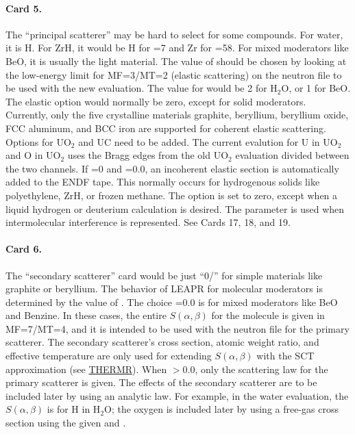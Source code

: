 \paragraph{Card 5.}
The ``principal scatterer'' may be hard to select for some compounds.
For water, it is H. For ZrH, it would be H for =7 and
Zr for =58.  For mixed moderators like BeO, it is usually
the light material.  The value of  should be chosen by
looking at the low-energy limit for MF=3/MT=2 (elastic scattering) on
the neutron file to be used with the new evaluation.  The value for
 would be 2 for H$_2$O, or 1 for BeO.  The elastic option
 would normally be zero, except for solid moderators.
Currently, only the five crystalline materials graphite, beryllium,
beryllium oxide, FCC aluminum, and BCC iron are supported for coherent
elastic scattering.  Options for UO$_2$ and UC need to be added.
The current evalution for U in UO$_2$ and O in UO$_2$ uses the Bragg
edges from the old UO$_2$ evaluation divided between the two channels.
If =0 and =0.0, an incoherent elastic section is
automatically added to the ENDF tape.  This normally occurs for
hydrogenous solids like polyethylene, ZrH, or frozen methane.  The
 option is set to zero, except when a liquid
hydrogen or deuterium calculation is desired.
The  parameter is used when intermolecular
interference is represented.
See Cards 17, 18, and 19.

\paragraph{Card 6.}
The ``secondary scatterer'' card would be just ``0/'' for simple
materials like graphite or beryllium.  The behavior of LEAPR for
molecular moderators is determined by the value of .
The choice =0.0 is for mixed moderators like BeO and
Benzine.  In these cases, the entire $S(\alpha,\beta)$ for the
molecule is given in MF=7/MT=4, and it is intended to be used with
the neutron file for the primary scatterer.  The secondary scatterer's
cross section, atomic weight ratio, and effective temperature are only
used for extending $S(\alpha,\beta)$ with the SCT approximation
(see \hyperlink{sTHERMRhy}{THERMR}).  When $>$0.0,
only the scattering law for the
primary scatterer is given.  The effects of the secondary scatterer are
to be included later by using an analytic law.  For example, in the
water evaluation, the $S(\alpha,\beta)$ is for H in H$_2$O; the oxygen
is included later by using a free-gas cross section using the given
 and .

